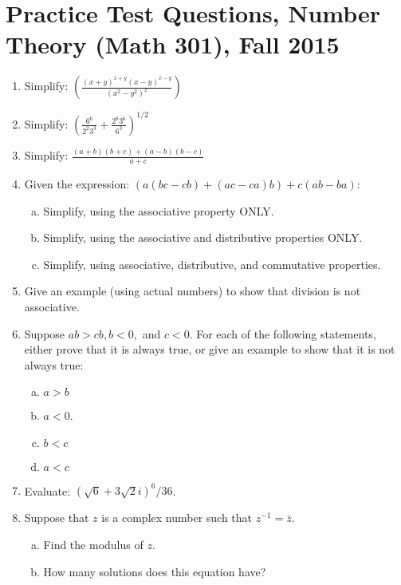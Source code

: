 \chapter{Practice Test Questions, Number Theory (Math 301), Fall 2015}\label{QuizPractice}

\begin{enumerate}[(1)]
\item
Simplify:
$\displaystyle{ \left(\frac{(x+y)^{x+y}(x-y)^{x-y}}{(x^2 - y^2)^x}\right)}$
\item
Simplify:
$ \displaystyle{\left( \frac{6^6}{2^2 3^3} +  \frac{2^8 3^6}{6^3}\right)^{1/2}} $
\item
Simplify:   $ \displaystyle{\frac{(a+b)(b+c) + (a-b)(b-c)}{a+c} }$
\item
Given the expression:  $( a(bc - cb) + (ac - ca)b) + c(ab - ba)$:
\begin{enumerate}[(a)]
\item
Simplify, using the associative property ONLY.
\item
Simplify, using the associative and distributive properties ONLY.
\item
Simplify, using associative, distributive, and commutative properties.
\end{enumerate}

\item
Give an example (using actual numbers) to show that division is not associative.
\item
Suppose $ab>cb, b < 0,$ and $c<0$.  For each of the following statements, either prove that it is always true, or give an example to show that
it is not always true:
\begin{enumerate}[(a)]
\item
$a > b$ \qquad 
\item
$a < 0$.
\item
$b < c$ \qquad 
\item
$a < c$ \qquad 
\end{enumerate}
\item
Evaluate: $(\sqrt{6}+3\sqrt{2}i)^6/36$.
\item
Suppose that $z$ is a complex number such that $z^{-1} = \bar{z}$.
\begin{enumerate}[(a)]
\item
 Find the modulus of $z$.
\item
How many solutions does this equation have?
\end{enumerate}
	

\end{enumerate}
